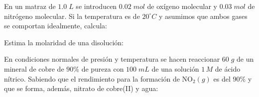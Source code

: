 \documentclass[a4paper,addpoints,14pt]{exam}
\newcommand*\chem[1]{\ensuremath{\mathrm{#1}}}
\begin{document}
\begin{questions}
\question[1] En un matraz de $1.0\;L$ se introducen $0.02\;mol$ de oxígeno molecular y $0.03\;mol$ de nitrógeno molecular. Si la temperatura es de $20^\circ C$ y asumimos que ambos gases se comportan idealmente, calcula:



\question[2] Estima la molaridad de una disolución:



\question[2]   En condiciones normales de presión y temperatura se hacen reaccionar $60\;g$ de un mineral de cobre de $90\%$ de pureza con $100\;mL$ de una solución $1\,M$ de ácido nítrico. Sabiendo que el rendimiento para la formación de $\chem{NO_2}(g)$ es del $90\%$ y que se forma, además, nitrato de cobre{\small (II)} y agua:
  	




\end{questions}
\end{document}
